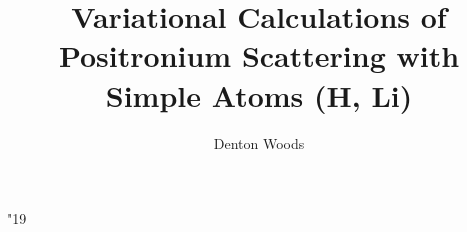 
\newcommand{\todoi}{\todo[inline]}

\DeclareMathSymbol \uppi {} {"19}

%



\renewcommand{\showlabelfont}{\tiny}

\graphicspath{{IPython/}{Images/}}

\setlength{\extrarowheight}{3pt}


\title{Variational Calculations of Positronium Scattering with Simple Atoms (H, Li)}
\author{Denton Woods}



\clearpage
{}
{} %
\maketitle
\newpage

